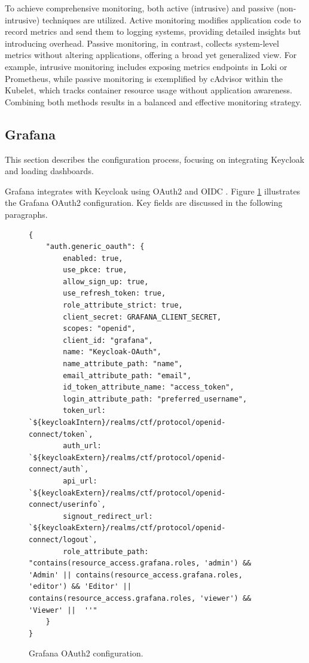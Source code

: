 To achieve comprehensive monitoring, both active (intrusive) and passive (non-intrusive) techniques are utilized. Active monitoring modifies application code to record metrics and send them to logging systems, providing detailed insights but introducing overhead. Passive monitoring, in contrast, collects system-level metrics without altering applications, offering a broad yet generalized view. For example, intrusive monitoring includes exposing metrics endpoints in Loki or Prometheus, while passive monitoring is exemplified by cAdvisor within the Kubelet, which tracks container resource usage without application awareness. Combining both methods results in a balanced and effective monitoring strategy.

\subsection{Grafana}
This section describes the configuration process, focusing on integrating Keycloak and loading dashboards.

Grafana integrates with Keycloak using OAuth2 and OIDC \parencite{GrafanaKeycloak}. Figure \ref{fig:grafana_oauth} illustrates the Grafana OAuth2 configuration. Key fields are discussed in the following paragraphs.

\begin{figure}[h]
    \centering
\begin{verbatim}
{
    "auth.generic_oauth": {
        enabled: true,
        use_pkce: true,
        allow_sign_up: true,
        use_refresh_token: true,
        role_attribute_strict: true,
        client_secret: GRAFANA_CLIENT_SECRET,
        scopes: "openid",
        client_id: "grafana",
        name: "Keycloak-OAuth",
        name_attribute_path: "name",
        email_attribute_path: "email",
        id_token_attribute_name: "access_token",
        login_attribute_path: "preferred_username",
        token_url: `${keycloakIntern}/realms/ctf/protocol/openid-connect/token`,
        auth_url: `${keycloakExtern}/realms/ctf/protocol/openid-connect/auth`,
        api_url: `${keycloakExtern}/realms/ctf/protocol/openid-connect/userinfo`,
        signout_redirect_url: `${keycloakExtern}/realms/ctf/protocol/openid-connect/logout`,
        role_attribute_path: "contains(resource_access.grafana.roles, 'admin') && 'Admin' || contains(resource_access.grafana.roles, 'editor') && 'Editor' || contains(resource_access.grafana.roles, 'viewer') && 'Viewer' ||  ''"
    }
}
\end{verbatim}
    \caption{Grafana OAuth2 configuration.}
    \label{fig:grafana_oauth}
\end{figure}

